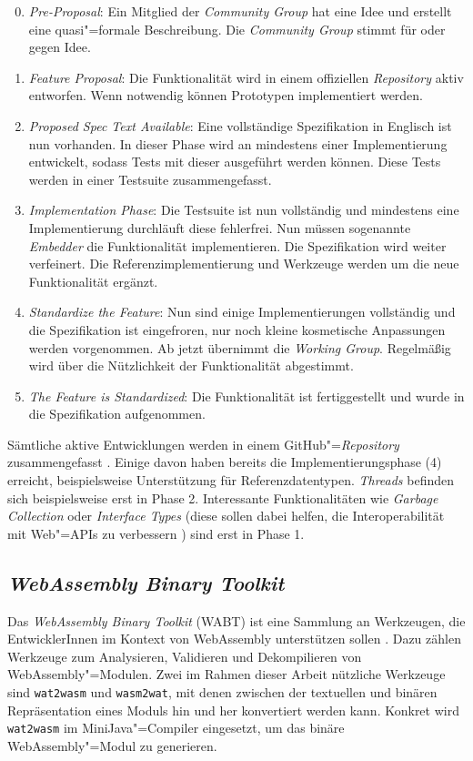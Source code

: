 \begin{enumerate}
    \setcounter{enumi}{-1}
    \item \emph{Pre-Proposal}: Ein Mitglied der \emph{Community Group} hat eine Idee und erstellt eine quasi"=formale Beschreibung. Die \emph{Community Group} stimmt für oder gegen Idee.
    \item \emph{Feature Proposal}: Die Funktionalität wird in einem offiziellen \emph{Repository} aktiv entworfen. Wenn notwendig können Prototypen implementiert werden.
    \item \emph{Proposed Spec Text Available}: Eine vollständige Spezifikation in Englisch ist nun vorhanden. In dieser Phase wird an mindestens einer Implementierung entwickelt, sodass Tests mit dieser ausgeführt werden können. Diese Tests werden in einer Testsuite zusammengefasst.
    \item \emph{Implementation Phase}: Die Testsuite ist nun vollständig und mindestens eine Implementierung durchläuft diese fehlerfrei. Nun müssen sogenannte \emph{Embedder} die Funktionalität implementieren. Die Spezifikation wird weiter verfeinert. Die Referenzimplementierung und Werkzeuge werden um die neue Funktionalität ergänzt.
    \item \emph{Standardize the Feature}: Nun sind einige Implementierungen vollständig und die Spezifikation ist eingefroren, nur noch kleine kosmetische Anpassungen werden vorgenommen. Ab jetzt übernimmt die \emph{Working Group}. Regelmäßig wird über die Nützlichkeit der Funktionalität abgestimmt.
    \item \emph{The Feature is Standardized}: Die Funktionalität ist fertiggestellt und wurde in die Spezifikation aufgenommen.
\end{enumerate}

Sämtliche aktive Entwicklungen werden in einem GitHub"=\emph{Repository} zusammengefasst \cite{WebAssemblyProposals}.
Einige davon haben bereits die Implementierungsphase (4) erreicht, beispielsweise Unterstützung für Referenzdatentypen. \emph{Threads} befinden sich beispielsweise erst in Phase 2. Interessante Funktionalitäten wie \emph{Garbage Collection} oder \emph{Interface Types} (diese sollen dabei helfen, die Interoperabilität mit Web"=APIs zu verbessern \cite{WebAssemblyInterfaceTypes}) sind erst in Phase 1.

\subsection{\emph{WebAssembly Binary Toolkit}}
Das \emph{WebAssembly Binary Toolkit} (WABT) ist eine Sammlung an Werkzeugen, die EntwicklerInnen im Kontext von WebAssembly unterstützen sollen \cite{WABT}. Dazu zählen Werkzeuge zum Analysieren, Validieren und Dekompilieren von WebAssembly"=Modulen. Zwei im Rahmen dieser Arbeit nützliche Werkzeuge sind \lstinline{wat2wasm} und \lstinline{wasm2wat}, mit denen zwischen der textuellen und binären Repräsentation eines Moduls hin und her konvertiert werden kann. Konkret wird \lstinline{wat2wasm} im MiniJava"=Compiler eingesetzt, um das binäre WebAssembly"=Modul zu generieren.

